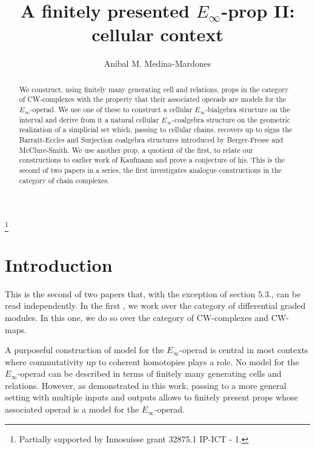 \documentclass{amsart}
\newcommand{\CW}{{\mathrm{CW}}}
\renewcommand{\1}{\mathbf{1}}
\theoremstyle{definition}
\begin{document}
\title{A finitely presented $E_\infty$-prop II: cellular context}
\author{Anibal M. Medina-Mardones}
\address{Department of Mathematics, University of Notre Dame, Notre Dame, IN 46556, United States}
\address{Max Planck Institute for Mathematics, Bonn, 53111, Germany}
\thanks{Partially supported by Innosuisse grant 32875.1 IP-ICT - 1.}

\begin{abstract}
	We construct, using finitely many generating cell and relations, props in the category of CW-complexes with the property that their associated operads are models for the $E_\infty$-operad. We use one of these to construct a cellular $E_\infty$-bialgebra structure on the interval and derive from it a natural cellular $E_\infty$-coalgebra structure on the geometric realization of a simplicial set which, passing to cellular chains, recovers up to signs the Barratt-Eccles and Surjection coalgebra structures introduced by Berger-Fresse and McClure-Smith. We use another prop, a quotient of the first, to relate our constructions to earlier work of Kaufmann and prove a conjecture of his. This is the second of two papers in a series, the first investigates analogue constructions in the category of chain complexes.
\end{abstract}

\maketitle

\section{Introduction}

This is the second of two papers that, with the exception of section 5.3., can be read independently. In the first \cite{medina2020prop1}, we work over the category of differential graded modules. In this one, we do so over the category of \mbox{$\CW$-complexes} and \mbox{$\CW$-maps}. 

A purposeful construction of model for the $E_\infty$-operad is central in most contexts where commutativity up to coherent homotopies plays a role. No model for the $E_\infty$-operad can be described in terms of finitely many generating cells and relations. However, as demonstrated in this work, passing to a more general setting with multiple inputs and outputs allows to finitely present props whose associated operad is a model for the $E_\infty$-operad. 
\end{document}

